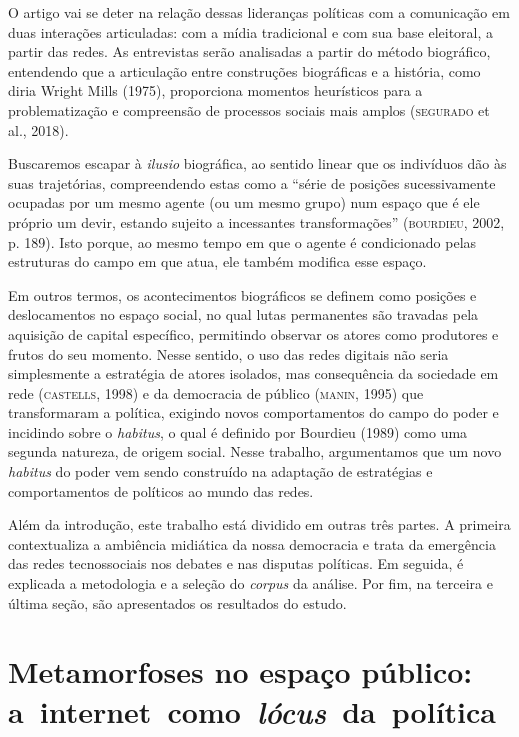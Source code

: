 O artigo vai se deter na relação dessas lideranças políticas com a
comunicação em duas interações articuladas: com a mídia tradicional e
com sua base eleitoral, a partir das redes. As entrevistas serão
analisadas a partir do método biográfico, entendendo que a articulação
entre construções biográficas e a história, como diria Wright Mills
(1975), proporciona momentos heurísticos para a problematização e
compreensão de processos sociais mais amplos (\textsc{segurado} et al., 2018).

Buscaremos escapar à \emph{ilusio} biográfica, ao sentido linear que os
indivíduos dão às suas trajetórias, compreendendo estas como a ``série
de posições sucessivamente ocupadas por um mesmo agente (ou um mesmo
grupo) num espaço que é ele próprio um devir, estando sujeito a
incessantes transformações'' (\textsc{bourdieu}, 2002, p. 189). Isto porque, ao
mesmo tempo em que o agente é condicionado pelas estruturas do campo em
que atua, ele também modifica esse espaço.

Em outros termos, os acontecimentos biográficos se definem como posições
e deslocamentos no espaço social, no qual lutas permanentes são travadas
pela aquisição de capital específico, permitindo observar os atores como
produtores e frutos do seu momento. Nesse sentido, o uso das redes
digitais não seria simplesmente a estratégia de atores isolados, mas
consequência da sociedade em rede (\textsc{castells}, 1998) e da democracia de
público (\textsc{manin}, 1995) que transformaram a política, exigindo novos
comportamentos do campo do poder e incidindo sobre o \emph{habitus}, o
qual é definido por Bourdieu (1989) como uma segunda natureza, de origem
social. Nesse trabalho, argumentamos que um novo \emph{habitus} do poder
vem sendo construído na adaptação de estratégias e comportamentos de
políticos ao mundo das redes.

Além da introdução, este trabalho está dividido em outras três partes. A
primeira contextualiza a ambiência midiática da nossa democracia e trata
da emergência das redes tecnossociais nos debates e nas disputas
políticas. Em seguida, é explicada a metodologia e a seleção do
\emph{corpus} da análise. Por fim, na terceira e última seção, são
apresentados os resultados do estudo.

\section{Metamorfoses no espaço público: a~internet~como~\emph{lócus}~da~política}

